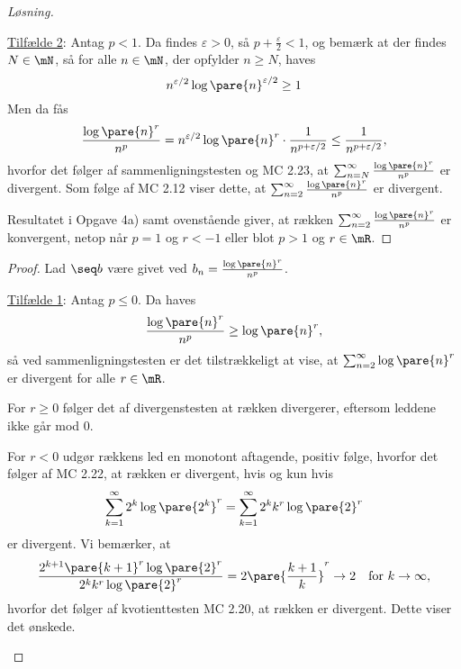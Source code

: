 \begin{opg}
\begin{enumerate}
\begin{proof}[Løsning]
\begin{indent}
    \underline{Tilfælde 2}: Antag $p < 1$. Da findes $\varepsilon>0$, så $p+\frac{\varepsilon}{2} < 1$, og bemærk at der findes $N\in\mN$, så for alle $n\in\mN$, der opfylder $n\geq N$, haves
    $$ n^{\varepsilon/2}\log\pare{n}^{\varepsilon/2} \geq 1 $$
    Men da fås
    $$ \frac{\log\pare{n}^r}{n^p}
        = n^{\varepsilon/2}\log\pare{n}^r\cdot\frac{1}{n^{p+\varepsilon/2}}
        \leq \frac{1}{n^{p+\varepsilon/2}}, $$
    hvorfor det følger af sammenligningstesten og MC 2.23, at $\sum_{n=N}^\infty \frac{\log\pare{n}^r}{n^p}$ er divergent. Som følge af MC 2.12 viser dette, at $\sum_{n=2}^\infty \frac{\log\pare{n}^r}{n^p}$ er divergent.
    \end{indent}
    Resultatet i Opgave 4a) samt ovenstående giver, at rækken $\sum_{n=2}^\infty \frac{\log\pare{n}^r}{n^p}$ er konvergent, netop når $p=1$ og $r<-1$ eller blot $p>1$ og $r\in\mR$.
    \end{proof}
    
    \iffalse
    \begin{proof}
    Lad $\seq b$ være givet ved $b_n = \frac{\log\pare{n}^r}{n^p}$.
    
    \begin{indent}
    \underline{Tilfælde 1}: Antag $p\leq 0$. Da haves
    $$ \frac{\log\pare{n}^r}{n^p} \geq \log\pare{n}^r, $$
    så ved sammenligningstesten er det tilstrækkeligt at vise, at $\sum_{n=2}^\infty \log\pare{n}^r$ er divergent for alle $r\in\mR$. 
    
    For $r\geq 0$ følger det af divergenstesten at rækken divergerer, eftersom leddene ikke går mod $0$.
    
    For $r<0$ udgør rækkens led en monotont aftagende, positiv følge, hvorfor det følger af MC 2.22, at rækken er divergent, hvis og kun hvis
    $$ \sum_{k=1}^\infty 2^k\log\pare{2^k}^r
        = \sum_{k=1}^\infty 2^kk^r\log\pare{2}^r $$ 
    er divergent. Vi bemærker, at
    $$ \frac{2^{k+1}\pare{k+1}^r\log\pare{2}^r}{2^kk^r\log\pare{2}^r}
        = 2\pare{\frac{k+1}{k}}^r \to 2 \quad \text{for } k\to\infty, $$
    hvorfor det følger af kvotienttesten MC 2.20, at rækken er divergent. Dette viser det ønskede.
    

\end{indent}
\end{proof}
\end{enumerate}
\end{opg}
